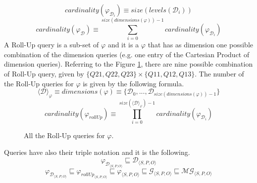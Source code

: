 \documentclass[12pt,a4paper]{report}
\newcommand\globalQuery{\varphi}
\newcommand\rollUpQuery{\varphi_{rollUp}}
\newcommand\targetGraph{\mathcal{G}}
\newcommand\subject{S}
\newcommand\predicate{P}
\newcommand\object{O}
\newcommand\triple[1]{#1_{\set{\subject,\predicate,\object}}}
\newcommand\dimension{\mathcal{D}}
\newcommand\dimensions{dimensions}
\newcommand\multidimensionalGraph{\mathcal{MG}}
\newcommand\levels{levels}
\newcommand\set[1]{\langle #1 \rangle}
\newcommand\dimensionQuery{\globalQuery_{\dimension}}
\begin{document}
\begin{equation}
    cardinality(\dimensionQuery_{i}) \equiv size(\levels(\dimension_{i}))
\end{equation}
%
\begin{equation}
    cardinality(\dimensionQuery) \equiv \sum_{i=0}^{size(\dimensions(\globalQuery)) - 1} cardinality(\dimensionQuery_{i})
\end{equation}
%
A Roll-Up query is a sub-set of $\globalQuery$ and it is a $\globalQuery$ that has as dimension one possible combination of the dimension queries (e.g. one entry of the Cartesian Product of dimension queries).
%
Referring to the Figure \ref{fig:roll-up-query}, there are nine possible combination of Roll-Up query, given by $\{Q21, Q22, Q23\} \times \{Q11, Q12, Q13\}$.
%
The number of the Roll-Up queries for $\globalQuery$ is given by the following formula.
%
\begin{equation}
    \set{\dimension}_{\globalQuery} \equiv \dimensions(\globalQuery) \equiv \{\dimension_{0},...,\dimension_{size(\dimensions(\globalQuery)) - 1}\}
\end{equation}
%
\begin{equation}
    cardinality(\rollUpQuery) \equiv \prod_{i=0}^{size(\set{\dimension}_{\globalQuery}) - 1} cardinality(\dimensionQuery_{i})
\end{equation}
%
\begin{figure} [ht]
    \caption{All the Roll-Up queries for $\globalQuery$.}
    \label{fig:roll-up-query}
\end{figure}

Queries have also their triple notation and it is the following.
%
\begin{equation}
    \triple{\dimensionQuery} \sqsubseteq \triple{\dimension}
\end{equation}
%
\begin{equation}
    \triple{\dimensionQuery} \sqsubseteq \triple{\rollUpQuery} \sqsubseteq \triple{\globalQuery} \sqsubseteq \triple{\targetGraph} \sqsubseteq \triple{\multidimensionalGraph}
\end{equation}
\end{document}
